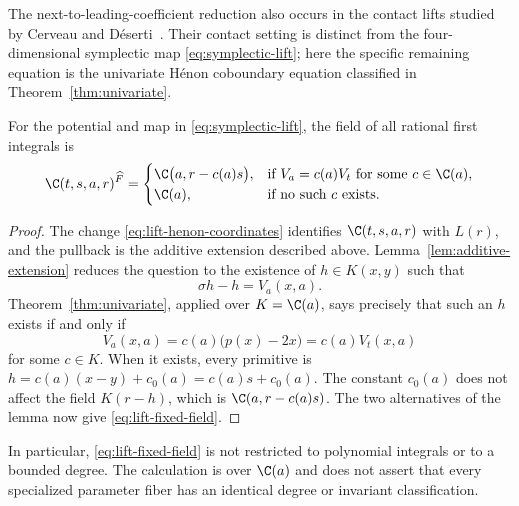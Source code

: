 The next-to-leading-coefficient reduction also occurs in the contact lifts
studied by Cerveau and D\'eserti~\cite{CerveauDeserti2018Contact}. Their
contact setting is distinct from the four-dimensional symplectic map
\eqref{eq:symplectic-lift}; here the specific remaining equation is the
univariate H\'enon coboundary equation classified in
Theorem~\ref{thm:univariate}.

\begin{theorem}
\label{thm:lift-field}
For the potential and map in \eqref{eq:symplectic-lift}, the field of all
rational first integrals is
\begin{equation}
 \C(t,s,a,r)^{\widehat F}=
 \begin{cases}
  \C\bigl(a,r-c(a)s\bigr),
    &\text{if }V_a=c(a)V_t\text{ for some }c\in\C(a),\\
  \C(a),&\text{if no such }c\text{ exists}.
 \end{cases}
 \label{eq:lift-fixed-field}
\end{equation}
\end{theorem}

\begin{proof}
The change \eqref{eq:lift-henon-coordinates} identifies
$\C(t,s,a,r)$ with $L(r)$, and the pullback is the additive extension
described above. Lemma~\ref{lem:additive-extension} reduces the question
to the existence of $h\in K(x,y)$ such that
\[
 \sigma h-h=V_a(x,a).
\]
Theorem~\ref{thm:univariate}, applied over $K=\C(a)$, says precisely that
such an $h$ exists if and only if
\[
 V_a(x,a)=c(a)\bigl(p(x)-2x\bigr)=c(a)V_t(x,a)
\]
for some $c\in K$. When it exists, every primitive is
$h=c(a)(x-y)+c_0(a)=c(a)s+c_0(a)$. The constant $c_0(a)$ does not affect
the field $K(r-h)$, which is $\C(a,r-c(a)s)$. The two alternatives of the
lemma now give \eqref{eq:lift-fixed-field}.
\end{proof}

In particular, \eqref{eq:lift-fixed-field} is not restricted to polynomial
integrals or to a bounded degree. The calculation is over $\C(a)$ and
does not assert that every specialized parameter fiber has an identical
degree or invariant classification.

